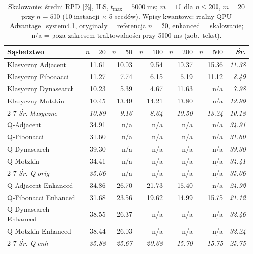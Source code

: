 \documentclass[11pt,a4paper]{article}
\begin{document}
\begin{table}[h]
\centering
\caption{Skalowanie: średni RPD [\%], ILS, $t_{\max}=5000$ ms; $m=10$
  dla $n\le200$, $m=20$ przy $n=500$ (10 instancji $\times$ 5 seedów).
  Wpisy kwantowe: realny QPU Advantage\_system4.1, oryginały =
  referencja $n=20$, enhanced = skalowanie; n/a = poza zakresem
  traktowalności przy 5000 ms (zob.\ tekst).}
\label{tab:rpd_scaling}
\small
\setlength{\tabcolsep}{3pt}
\begin{tabular}{@{}lrrrrr@{\quad}r@{}}
\toprule
Sąsiedztwo & $n=20$ & $n=50$ & $n=100$ & $n=200$ & $n=500$ & \emph{Śr.} \\
\midrule
Klasyczny Adjacent         & 11.61 & 10.03 &  9.54 & 10.37 & 15.36 & \emph{11.38} \\
Klasyczny Fibonacci        & 11.27 &  7.74 &  6.15 &  6.19 & 11.12 & \emph{8.49} \\
Klasyczny Dynasearch       & 10.23 &  5.39 &  4.67 & 11.63 & n/a & \emph{7.98} \\
Klasyczny Motzkin          & 10.45 & 13.49 & 14.21 & 13.80 & n/a & \emph{12.99} \\
\cmidrule(l){2-7}
\emph{Śr. klasyczne}       & \emph{10.89} & \emph{9.16} & \emph{8.64} & \emph{10.50} & \emph{13.24} & \emph{10.18} \\
\midrule
Q-Adjacent                 & 34.91 & n/a & n/a & n/a & n/a & \emph{34.91} \\
Q-Fibonacci                & 31.60 & n/a & n/a & n/a & n/a & \emph{31.60} \\
Q-Dynasearch               & 39.30 & n/a & n/a & n/a & n/a & \emph{39.30} \\
Q-Motzkin                  & 34.41 & n/a & n/a & n/a & n/a & \emph{34.41} \\
\cmidrule(l){2-7}
\emph{Śr. Q-orig}          & \emph{35.06} & n/a & n/a & n/a & n/a & \emph{35.06} \\
\midrule
Q-Adjacent Enhanced        & 34.86 & 26.70 & 21.73 & 16.40 & n/a & \emph{24.92} \\
Q-Fibonacci Enhanced       & 31.68 & 23.56 & 19.62 & 14.99 & 15.75 & \emph{21.12} \\
Q-Dynasearch Enhanced      & 38.55 & 26.37 & n/a & n/a & n/a & \emph{32.46} \\
Q-Motzkin Enhanced         & 38.44 & 26.03 & n/a & n/a & n/a & \emph{32.24} \\
\cmidrule(l){2-7}
\emph{Śr. Q-enh}           & \emph{35.88} & \emph{25.67} & \emph{20.68} & \emph{15.70} & \emph{15.75} & \emph{25.75} \\
\bottomrule
\end{tabular}
\end{table}
\end{document}
